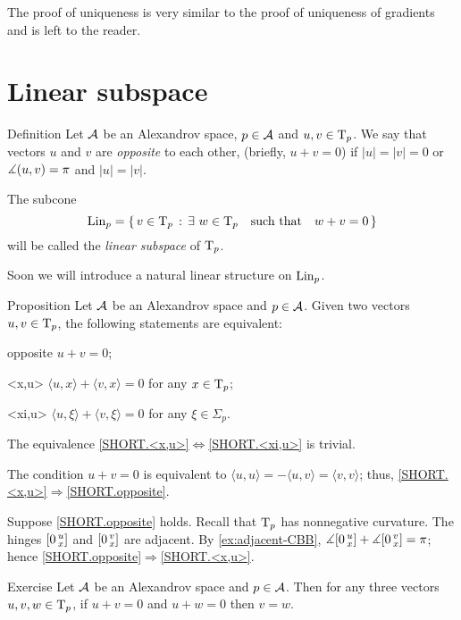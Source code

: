 The proof of uniqueness is very similar to the proof of uniqueness of gradients and is left to the reader.
\qedsf

\section{Linear subspace}

\begin{thm}{Definition}\label{def:opp+Lin}
Let $\mathcal{A}$ be an Alexandrov space, $p\in \mathcal{A}$ and $u,v\in\mathrm{T}_p$.
We say that vectors $u$ and $v$ are \emph{opposite}\label{def:opposite:page} to each other, (briefly, $u+v=0$) if $|u|=|v|=0$ or $\measuredangle(u,v)=\pi$ and $|u|=|v|$.

The subcone
\[\mathop{\rm Lin}\nolimits_p=\left\{\,{v\in\mathrm{T}_p}\,:\,{\exists\ w\in\mathrm{T}_p\quad \text{such that}\quad w+v=0}\,\right\}\]
will be called the \emph{linear subspace} of $\mathrm{T}_p$.
\end{thm}

Soon we will introduce a natural linear structure on $\mathop{\rm Lin}\nolimits_p$.

\begin{thm}{Proposition}\label{prop:opposite}
Let $\mathcal{A}$ be an Alexandrov space and $p\in \mathcal{A}$.
Given two vectors $u,v\in\mathrm{T}_p$, the following statements are equivalent:
\begin{subthm}{opposite} $u+v=0$;
\end{subthm}
\begin{subthm}{<x,u>} $\langle u,x\rangle +\langle v,x\rangle =0$ for any $x\in\mathrm{T}_p$;
\end{subthm}
\begin{subthm}{<xi,u>} $\langle u,\xi\rangle +\langle v,\xi\rangle =0$ for any $\xi\in\Sigma_p$.
\end{subthm}
\end{thm}

The equivalence  \ref{SHORT.<x,u>}$\Leftrightarrow$\ref{SHORT.<xi,u>} is trivial.

The condition $u+v=0$ is equivalent to 
$\langle u,u\rangle =-\langle u,v\rangle =\langle v,v\rangle$;
thus,
\ref{SHORT.<x,u>}$\Rightarrow$\ref{SHORT.opposite}.

Suppose  \ref{SHORT.opposite} holds.
Recall that $\mathrm{T}_p$ has nonnegative curvature.
The hinges $[0\,{}^{u}_{x}]$ and $[0\,{}^{v}_{x}]$ are adjacent.
By \ref{ex:adjacent-CBB}, $\measuredangle[0\,{}^{u}_{x}]+\measuredangle[0\,{}^{v}_{x}]=\pi$;
hence \ref{SHORT.opposite}$\Rightarrow$\ref{SHORT.<x,u>}.
\qeds

\begin{thm}{Exercise}\label{prop:two-opp}
Let $\mathcal{A}$  be an Alexandrov space and $p\in \mathcal{A}$.
Then for any three vectors $u,v,w\in\mathrm{T}_p$, if $u+v=0$ and $u+ w=0$ then $v=w$.
\end{thm}


